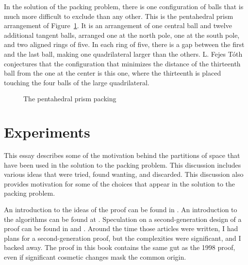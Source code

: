 

In the solution of the packing problem, there is one configuration
of balls that is much more difficult to exclude than any other.  This
is the pentahedral prism arrangement of Figure~\ref{fig:pent-prism}.
It is an arrangement of one central ball and twelve additional tangent
balls, arranged one at the north pole, one at the south pole, and two
aligned rings of five.  In each ring of five, there is a gap between the
first and the last ball, making one quadrilateral larger than the others.
L. Fejes T\'oth conjectures that the configuration that minimizes
the distance of the thirteenth ball from the one at the center is this one,
where the thirteenth is placed touching the four balls of the large
quadrilateral.

\begin{figure}[htb]
  \centering
  \caption{The pentahedral prism packing}
  \label{fig:pent-prism}
\end{figure}




\clearpage






\section{Experiments}

\label{sec:experiment}





This essay describes some of the
motivation behind the partitions of space that have been used in the
solution to the packing problem.  This discussion includes various
ideas that were tried, found wanting, and discarded. This
discussion also provides motivation for some of the choices that appear
in the solution to the packing problem.

An introduction to the ideas of the proof can be found in
\cite{CH}. An introduction to the algorithms can be found at
\cite{algorithm}. Speculation on a second-generation design of a
proof can be found in \cite{algorithm} and \cite{arbeitstagung}.
Around the time those articles were written, I had plans for
a second-generation proof, but the complexities were significant,
and I backed away.  The proof in this book contains the same gut
as the 1998 proof, even if significant  cosmetic changes 
mask the common origin.




